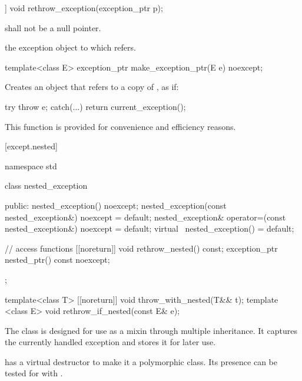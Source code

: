 \begin{itemdecl}
[[noreturn]] void rethrow_exception(exception_ptr p);
\end{itemdecl}

\begin{itemdescr}
\pnum
\requires {} shall not be a null pointer.

\pnum
\throws the exception object to which  refers.
\end{itemdescr}

\begin{itemdecl}
template<class E> exception_ptr make_exception_ptr(E e) noexcept;
\end{itemdecl}

\begin{itemdescr}
\pnum
\effects Creates an  object that refers to a copy of , as if:
\begin{codeblock}
try {
  throw e;
} catch(...) {
  return current_exception();
}
\end{codeblock}

\pnum
\enternote This function is provided for convenience and
efficiency reasons. \exitnote
\end{itemdescr}

[except.nested]{}

%
\begin{codeblock}
namespace std {
  class nested_exception {
  public:
    nested_exception() noexcept;
    nested_exception(const nested_exception&) noexcept = default;
    nested_exception& operator=(const nested_exception&) noexcept = default;
    virtual ~nested_exception() = default;

    // access functions
    [[noreturn]] void rethrow_nested() const;
    exception_ptr nested_ptr() const noexcept;
  };

  template<class T> [[noreturn]] void throw_with_nested(T&& t);
  template <class E> void rethrow_if_nested(const E& e);
}
\end{codeblock}

\pnum
The class  is designed for use as a mixin through
multiple inheritance. It captures the currently handled exception and stores it
for later use.

\pnum
\enternote {} has a virtual destructor to make it a
polymorphic class. Its presence can be tested for with .
\exitnote

